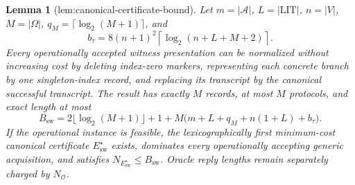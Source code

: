 \documentclass{article}
\newtheorem{lemma}{Lemma}
\begin{document}
\begin{lemma}[lem:canonical-certificate-bound]\label{lem:canonical-certificate-bound}
Let \(m=|\mathcal A|\), \(L=|\mathrm{LIT}|\), \(n=|V|\), \(M=|\Omega|\), \(q_M=\lceil\log_2(M+1)\rceil\), and
\[
 b_{\tau}=8(n+1)^2\left\lceil\log_2(n+L+M+2)\right\rceil.
\]
Every operationally accepted witness presentation can be normalized without increasing cost by deleting index-zero markers, representing each concrete branch by one singleton-index record, and replacing its transcript by the canonical successful transcript.  The result has exactly \(M\) records, at most \(M\) protocols, and exact length at most
\[
 B_{\mathrm{sw}}
 =2\lfloor\log_2(M+1)\rfloor+1
 +M\bigl(m+L+q_M+n(1+L)+b_{\tau}\bigr).
\]
If the operational instance is feasible, the lexicographically first minimum-cost canonical certificate \(E_{\mathrm{sw}}^{\star}\) exists, dominates every operationally accepting generic acquisition, and satisfies \(N_{E_{\mathrm{sw}}^{\star}}\leq B_{\mathrm{sw}}\).  Oracle reply lengths remain separately charged by \(N_{\mathcal O}\).

\end{lemma}
\end{document}
